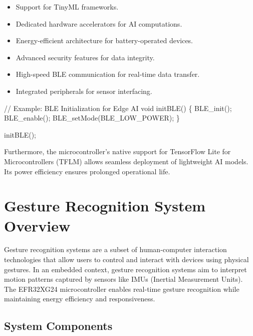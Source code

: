 \documentclass[
  9pt,
  letterpaper,
  abstract,
  titlepage]{scrbook}
\newenvironment{Shaded}{\begin{snugshade}}{\end{snugshade}}
\newcommand{\CommentTok}[1]{\textcolor[rgb]{0.37,0.37,0.37}{#1}}
\newcommand{\DataTypeTok}[1]{\textcolor[rgb]{0.68,0.00,0.00}{#1}}
\newcommand{\NormalTok}[1]{\textcolor[rgb]{0.00,0.23,0.31}{#1}}
\newcommand{\OperatorTok}[1]{\textcolor[rgb]{0.37,0.37,0.37}{#1}}
\begin{document}
\begin{itemize}
\item
  Support for TinyML frameworks.
\item
  Dedicated hardware accelerators for AI computations.
\item
  Energy-efficient architecture for battery-operated devices.
\item
  Advanced security features for data integrity.
\item
  High-speed BLE communication for real-time data transfer.
\item
  Integrated peripherals for sensor interfacing.
\end{itemize}

\begin{Shaded}
\begin{Highlighting}[]
\CommentTok{// Example: BLE Initialization for Edge AI}
\DataTypeTok{void}\NormalTok{ initBLE}\OperatorTok{()} \OperatorTok{\{}
\NormalTok{    BLE\_init}\OperatorTok{();}
\NormalTok{    BLE\_enable}\OperatorTok{();}
\NormalTok{    BLE\_setMode}\OperatorTok{(}\NormalTok{BLE\_LOW\_POWER}\OperatorTok{);}
\OperatorTok{\}}

\NormalTok{initBLE}\OperatorTok{();}
\end{Highlighting}
\end{Shaded}

Furthermore, the microcontroller's native support for TensorFlow Lite
for Microcontrollers (TFLM) allows seamless deployment of lightweight AI
models. Its power efficiency ensures prolonged operational life.

\section{Gesture Recognition System
Overview}\label{gesture-recognition-system-overview}

Gesture recognition systems are a subset of human-computer interaction
technologies that allow users to control and interact with devices using
physical gestures. In an embedded context, gesture recognition systems
aim to interpret motion patterns captured by sensors like IMUs (Inertial
Measurement Units). The EFR32XG24 microcontroller enables real-time
gesture recognition while maintaining energy efficiency and
responsiveness.

\subsection{System Components}\label{system-components}
\end{document}
